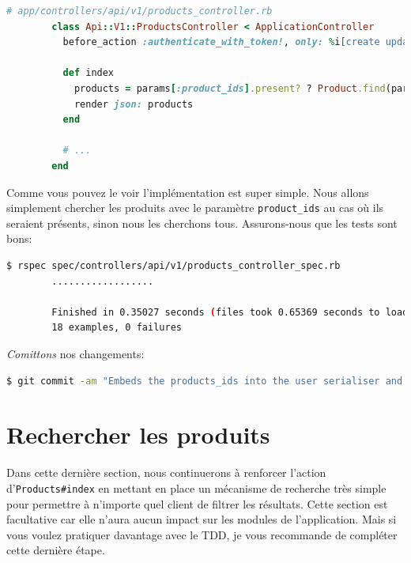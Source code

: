 \documentclass[]{report}
\begin{document}
      \begin{scriptsize}
        \begin{lstlisting}[language=ruby]
        # app/controllers/api/v1/products_controller.rb
        class Api::V1::ProductsController < ApplicationController
          before_action :authenticate_with_token!, only: %i[create update destroy]

          def index
            products = params[:product_ids].present? ? Product.find(params[:product_ids]) : Product.all
            render json: products
          end

          # ...
        end
        \end{lstlisting}
      \end{scriptsize}

      Comme vous pouvez le voir l'implémentation est super simple. Nous allons simplement chercher les produits avec le paramètre \verb|product_ids| au cas où ils seraient présents, sinon nous les cherchons tous. Assurons-nous que les tests sont bons:

      \begin{scriptsize}
        \begin{lstlisting}[language=bash]
        $ rspec spec/controllers/api/v1/products_controller_spec.rb
        ..................

        Finished in 0.35027 seconds (files took 0.65369 seconds to load)
        18 examples, 0 failures
        \end{lstlisting}
      \end{scriptsize}

      \textit{Comittons} nos changements:

      \begin{scriptsize}
        \begin{lstlisting}[language=bash]
        $ git commit -am "Embeds the products_ids into the user serialiser and fetches the correct products from the index action endpoint"
        \end{lstlisting}
      \end{scriptsize}

  \section{Rechercher les produits}

    Dans cette dernière section, nous continuerons à renforcer l'action d'\verb|Products#index| en mettant en place un mécanisme de recherche très simple pour permettre à n'importe quel client de filtrer les résultats. Cette section est facultative car elle n'aura aucun impact sur les modules de l'application. Mais si vous voulez pratiquer davantage avec le TDD, je vous recommande de compléter cette dernière étape.
\end{document}
